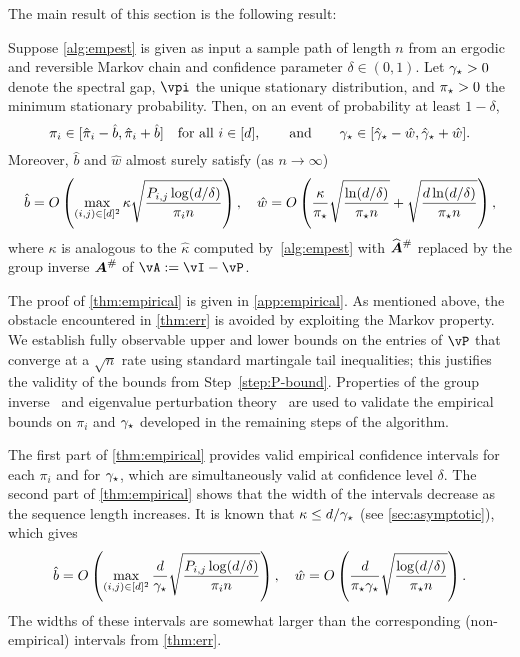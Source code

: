The main result of this section is the following result:
\begin{theorem}
  \label{thm:empirical}
  Suppose \cref{alg:empest} is given as input a sample path of length
  $n$ from an ergodic and reversible Markov chain and confidence
  parameter $\delta \in (0,1)$.
  Let $\gamma_{\star}>0$ denote the spectral gap, $\vpi$ the unique stationary
  distribution, and $\pi_{\star}>0$ the minimum stationary probability.
  Then, on an event of probability at least $1-\delta$,
  \[
    \pi_i \in [\hat\pi_i-\hat{b},\hat\pi_i+\hat{b}]
    \quad \text{for all $i \in [d]$} ,
    \qquad\text{and}\qquad
    \gamma_{\star} \in [\hat\gamma_{\star}-\hat{w},\hat\gamma_{\star}+\hat{w}]
    .
  \]
  Moreover, $\hat{b}$ and $\hat{w}$ almost surely satisfy (as $n \to
  \infty$)
  \[
    \hat{b}
    =
    O\left(
      \max_{(i,j) \in [d]^2}
      \kappa
      \sqrt{\frac{P_{i,j}\log(d/\delta)}{\pi_i n}}
    \right)
    ,
    \quad
    \hat{w}
    =
     O\left( 
     \frac{\kappa}{\pi_{\star}} \sqrt{\frac{\ln(d/\delta)}{\pi_{\star} n}} + 
      \sqrt{ \frac{d\ln(d/\delta)}{ \pi_{\star} n}}
    \right)
    ,
  \]
  where $\kappa$ is analogous to the $\hat{\kappa}$ computed
  by~\cref{alg:empest} with $\giAh$ replaced by the group inverse
  $\giA$ of $\vA := \vI - \vP$.
\end{theorem}
The proof of \cref{thm:empirical} is given in \cref{app:empirical}.
As mentioned above, the obstacle encountered in \cref{thm:err} is
avoided by exploiting the Markov property.
We establish fully observable upper and lower bounds on the entries of
$\vP$ that converge at a $\sqrt{n}$ rate using standard martingale
tail inequalities; this justifies the validity of the bounds from
Step~\ref{step:P-bound}.
Properties of the group inverse~\citep{meyer1975role,cho2001comparison} and eigenvalue
perturbation theory~\citep{stewart1990matrix} are used to validate the
empirical bounds on $\pi_i$ and $\gamma_{\star}$ developed in the remaining
steps of the algorithm.

The first part of \cref{thm:empirical} provides valid empirical
confidence intervals for each $\pi_i$ and for $\gamma_{\star}$, which are
simultaneously valid at confidence level $\delta$.
The second part of \cref{thm:empirical} shows that the width of the
intervals decrease as the sequence length increases.
It is known that $\kappa \le d/\gamma_{\star}$ (see \cref{sec:asymptotic}),
which gives
\[
  \hat{b}
  =
  O\left(
    \max_{(i,j) \in [d]^2}
    \frac{d}{\gamma_{\star}}
    \sqrt{\frac{P_{i,j}\log(d/\delta)}{\pi_i n}}
  \right)
  , \quad
  \hat{w}
  =
  O\left( 
    \frac{d}{\pi_{\star}\gamma_{\star}} \sqrt{\frac{\log(d/\delta)}{\pi_{\star} n}}
  \right)
  .
\] 
The widths of these intervals are somewhat larger than the corresponding
(non-empirical) intervals from \cref{thm:err}.

